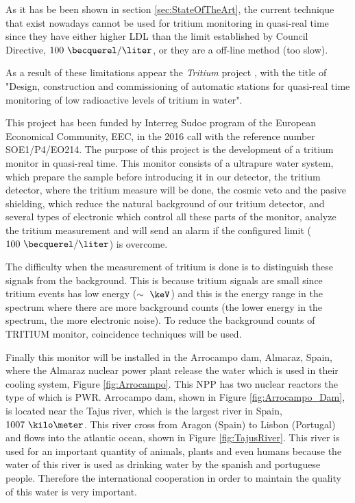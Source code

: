 As it has be been shown in section \ref{sec:StateOfTheArt}, the current technique that exist nowadays cannot be used for tritium monitoring in quasi-real time since they have either higher LDL than the limit established by Council Directive, $100~\becquerel/\liter$, or they are a off-line method (too slow). 

As a result of these limitations appear the \textit{Tritium} project \cite{TRITIUM}, with the title of "Design, construction and commissioning of automatic stations for quasi-real time monitoring of low radioactive levels of tritium in water".

This project has been funded by Interreg Sudoe program of the European Economical Community, EEC, in the 2016 call with the reference number SOE1/P4/EO214. The purpose of this project is the development of a tritium monitor in quasi-real time. This monitor consists of a ultrapure water system, which prepare the sample before introducing it in our detector, the tritium detector, where the tritium measure will be done, the cosmic veto and the pasive shielding, which reduce the natural background of our tritium detector, and several types of electronic which control all these parts of the monitor, analyze the tritium measurement and will send an alarm if the configured limit ($100~\becquerel/\liter$) is overcome.

The difficulty when the measurement of tritium is done is to distinguish these signals from the background. This is because tritium signals are small since tritium events has low energy ($\sim~\keV$) and this is the energy range in the spectrum where there are more background counts (the lower energy in the spectrum, the more electronic noise). To reduce the background counts of TRITIUM monitor, coincidence techniques will be used.

Finally this monitor will be installed in the Arrocampo dam, Almaraz, Spain, where the Almaraz nuclear power plant release the water which is used in their cooling system, Figure \ref{fig:Arrocampo}. This NPP has two nuclear reactors the type of which is PWR. Arrocampo dam, shown in Figure \ref{fig:Arrocampo_Dam}, is located near the Tajus river, which is the largest river in Spain, $1007~\kilo\meter$. This river cross from Aragon (Spain) to Lisbon (Portugal) and flows into the atlantic ocean, shown in Figure \ref{fig:TajusRiver}. This river is used for an important quantity of animals, plants and even humans because the water of this river is used as drinking water by the spanish and portuguese people. Therefore the international cooperation in order to maintain the quality of this water is very important.

